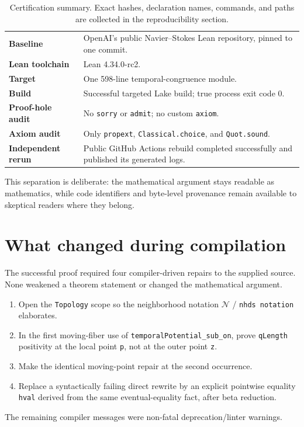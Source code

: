 \documentclass[11pt]{article}
\theoremstyle{highend}
\theoremstyle{definition}
\begin{document}
\begin{table}[h]
\centering
\small
\begin{tabularx}{0.96\textwidth}{@{}>{\bfseries}p{}X@{}}
\toprule
Baseline & OpenAI's public Navier--Stokes Lean repository, pinned to one commit.\\
Lean toolchain & Lean 4.34.0-rc2.\\
Target & One 598-line temporal-congruence module.\\
Build & Successful targeted Lake build; true process exit code 0.\\
Proof-hole audit & No \texttt{sorry} or \texttt{admit}; no custom \texttt{axiom}.\\
Axiom audit & Only \texttt{propext}, \texttt{Classical.choice}, and \texttt{Quot.sound}.\\
Independent rerun & Public GitHub Actions rebuild completed successfully and published its generated logs.\\
\bottomrule
\end{tabularx}
\caption{Certification summary. Exact hashes, declaration names, commands, and paths are collected in the reproducibility section.}
\end{table}

This separation is deliberate: the mathematical argument stays readable as mathematics, while code identifiers and byte-level provenance remain available to skeptical readers where they belong.

\section{What changed during compilation}
The successful proof required four compiler-driven repairs to the supplied source. None weakened a theorem statement or changed the mathematical argument.
\begin{enumerate}[leftmargin=1.6em]
\item Open the \texttt{Topology} scope so the neighborhood notation \(\mathcal N\) / \texttt{nhds notation} elaborates.
\item In the first moving-fiber use of \texttt{temporalPotential\_sub\_on}, prove \texttt{qLength} positivity at the local point \texttt{p}, not at the outer point \texttt{z}.
\item Make the identical moving-point repair at the second occurrence.
\item Replace a syntactically failing direct rewrite by an explicit pointwise equality \texttt{hval} derived from the same eventual-equality fact, after beta reduction.
\end{enumerate}
The remaining compiler messages were non-fatal deprecation/linter warnings.
\end{document}
